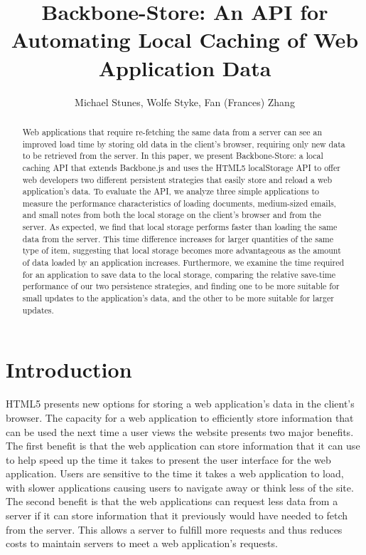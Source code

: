 \documentclass[12pt]{article}
\title{Backbone-Store: An API for Automating Local Caching of Web Application
Data}
\author{Michael Stunes, Wolfe Styke, Fan (Frances) Zhang}
\begin{document}
\maketitle

\begin{abstract}
Web applications that require re-fetching the same data from a server
can see an improved load time by storing old data in the client's browser,
requiring only new data to be retrieved from the server. In this paper, we present Backbone-Store: a local caching API that extends Backbone.js and uses the HTML5 localStorage API to offer web developers two different persistent strategies that easily store and reload a web application's data. To evaluate the API,  we analyze three simple applications to measure the performance characteristics of loading documents, medium-sized emails, and small notes from both the local storage on the client's browser and from the server. As expected, we find that local storage performs
faster than loading the same data from the server. This time difference
increases for larger quantities of the same type of item, suggesting that local storage becomes more advantageous as the amount of data loaded by an application increases. Furthermore, we examine the time required for an application to save data to the local storage, comparing the relative save-time performance of our two persistence strategies, and finding one to be more suitable for small updates to the application's data, and the other to be more suitable for larger updates.
\end{abstract}

\section{Introduction}

HTML5 presents new options for storing a web application's data in the client's
browser. The capacity for a web application to efficiently store information
that can be used the next time a user views the website presents two major
benefits. The first benefit is that the web application can store information
that it can use to help speed up the time it takes to present the user
interface for the web application. Users are sensitive to the time it takes a
web application to load, with slower applications causing users to navigate
away or think less of the site. The second benefit is that the web applications
can request less data from a server if it can store information that it
previously would have needed to fetch from the server. This allows a server to
fulfill more requests and thus reduces costs to maintain servers to meet a web
application's requests.
\end{document}
